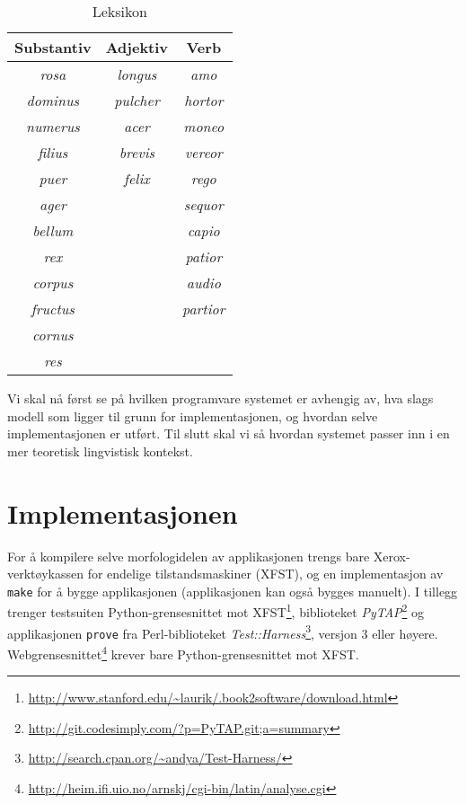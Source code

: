\documentclass{article}
\newcommand\link[1]{\href{#1}{#1}}
\let\lib\emph
\let\prog\texttt
\let\w\emph
\begin{document}
\begin{table}
\begin{center}
\begin{tabular}{|ccc|}
    \hline
Substantiv  & Adjektiv    & Verb \\
    \hline
\w{rosa}    & \w{longus}  & \w{amo}     \\
\w{dominus} & \w{pulcher} & \w{hortor}  \\
\w{numerus} & \w{acer}    & \w{moneo}   \\
\w{filius}  & \w{brevis}  & \w{vereor}  \\
\w{puer}    & \w{felix}   & \w{rego}    \\
\w{ager}    &             & \w{sequor}  \\
\w{bellum}  &             & \w{capio}   \\
\w{rex}     &             & \w{patior}  \\
\w{corpus}  &             & \w{audio}   \\
\w{fructus} &             & \w{partior} \\
\w{cornus}  &             &             \\
\w{res}     &             &             \\
    \hline
\end{tabular}
\end{center}
\caption{Leksikon}
\label{leksikon}
\end{table}

Vi skal n\aa{} f\o{}rst se p\aa{} hvilken programvare systemet er avhengig av,
hva slags modell som ligger til grunn for implementasjonen, og hvordan selve
implementasjonen er utf\o{}rt. Til slutt skal vi s\aa{} hvordan systemet
passer inn i en mer teoretisk lingvistisk kontekst.

\section{Implementasjonen}
For \aa{} kompilere selve morfologidelen av applikasjonen trengs bare
Xerox-verkt\o{}y\-kassen for endelige tilstandsmaskiner (XFST), og en
implementasjon av \prog{make} for \aa{} bygge applikasjonen (applikasjonen kan
ogs\aa{} bygges manuelt). I tillegg trenger testsuiten Python-grensesnittet mot
XFST\footnote{\href{http://www.stanford.edu/~laurik/.book2software/download.html}
{http://www.stanford.edu/\~{}laurik/.book2software/download.html}}, biblioteket
\lib{PyTAP}\footnote{\link{http://git.codesimply.com/?p=PyTAP.git;a=summary}}
og applikasjonen \prog{prove} fra Perl-biblioteket
\lib{Test::Harness}\footnote{\href{http://search.cpan.org/~andya/Test-Harness/}
{http://search.cpan.org/\~{}andya/Test-Harness/}},
versjon 3 eller h\o{}yere.
Webgrensesnittet\footnote{\link{http://heim.ifi.uio.no/arnskj/cgi-bin/latin/analyse.cgi}}
krever bare Python-grensesnittet mot XFST.
\end{document}
